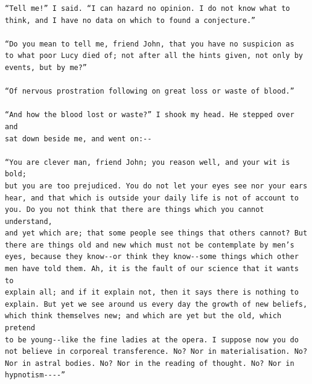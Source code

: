 \documentclass{article}
\begin{document}
\begin{verbatim}
“Tell me!” I said. “I can hazard no opinion. I do not know what to
think, and I have no data on which to found a conjecture.”

“Do you mean to tell me, friend John, that you have no suspicion as
to what poor Lucy died of; not after all the hints given, not only by
events, but by me?”

“Of nervous prostration following on great loss or waste of blood.”

“And how the blood lost or waste?” I shook my head. He stepped over and
sat down beside me, and went on:--

“You are clever man, friend John; you reason well, and your wit is bold;
but you are too prejudiced. You do not let your eyes see nor your ears
hear, and that which is outside your daily life is not of account to
you. Do you not think that there are things which you cannot understand,
and yet which are; that some people see things that others cannot? But
there are things old and new which must not be contemplate by men’s
eyes, because they know--or think they know--some things which other
men have told them. Ah, it is the fault of our science that it wants to
explain all; and if it explain not, then it says there is nothing to
explain. But yet we see around us every day the growth of new beliefs,
which think themselves new; and which are yet but the old, which pretend
to be young--like the fine ladies at the opera. I suppose now you do
not believe in corporeal transference. No? Nor in materialisation. No?
Nor in astral bodies. No? Nor in the reading of thought. No? Nor in
hypnotism----”


\end{verbatim}
\end{document}
